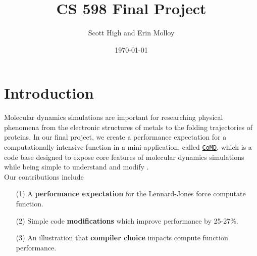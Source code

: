 \documentclass[12pt]{article}
\title{CS 598 Final Project}
\author{Scott High and Erin Molloy}
\date{\today}
\begin{document}
\maketitle

\section{Introduction}
Molecular dynamics simulations are important for researching physical phenomena 
from the electronic structures of metals to the folding trajectories of proteins. 
In our final project, we create a performance expectation for a computationally
intensive function in a mini-application, called \href{https://github.com/exmatex/CoMD}{\texttt{CoMD}}, 
which is a code base designed to expose core features of molecular dynamics simulations
while being simple to understand and modify \cite{CoMD}. \\
 Our contributions include
\begin{itemize}
    \item [(1)] A {\bf performance expectation} for the Lennard-Jones force computate function.
    \item [(2)] Simple code {\bf modifications} which improve performance by 25-27\%.
    \item [(3)] An illustration that {\bf compiler choice} impacts compute function performance.
\end{itemize}
\end{document}
